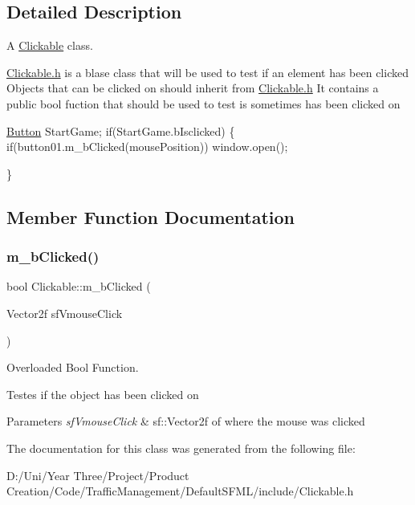 \subsection{Detailed Description}
A \hyperlink{class_clickable}{Clickable} class.

\hyperlink{_clickable_8h_source}{Clickable.\+h} is a blase class that will be used to test if an element has been clicked Objects that can be clicked on should inherit from \hyperlink{_clickable_8h_source}{Clickable.\+h} It contains a public bool fuction that should be used to test is sometimes has been clicked on 
\begin{DoxyCode}
\hyperlink{class_button}{Button} StartGame;
\textcolor{keywordflow}{if}(StartGame.bIsclicked)
\{
    \textcolor{keywordflow}{if}(button01.m\_bClicked(mousePosition)) window.open();

\}
\end{DoxyCode}
 

\subsection{Member Function Documentation}
\hypertarget{class_clickable_a18e5ca51c572c9cb8a64dced28ccec09}{}\label{class_clickable_a18e5ca51c572c9cb8a64dced28ccec09} 
\subsubsection{\texorpdfstring{m\+\_\+b\+Clicked()}{m\_bClicked()}}
{\footnotesize\ttfamily bool Clickable\+::m\+\_\+b\+Clicked (\begin{DoxyParamCaption}\item[{Vector2f}]{sf\+Vmouse\+Click }\end{DoxyParamCaption})}



Overloaded Bool Function. 

Testes if the object has been clicked on


\begin{DoxyParams}{Parameters}
{\em sf\+Vmouse\+Click} & sf\+::\+Vector2f of where the mouse was clicked \\
\hline
\end{DoxyParams}


The documentation for this class was generated from the following file\+:\begin{DoxyCompactItemize}
\item 
D\+:/\+Uni/\+Year Three/\+Project/\+Product Creation/\+Code/\+Traffic\+Management/\+Default\+S\+F\+M\+L/include/Clickable.\+h\end{DoxyCompactItemize}
